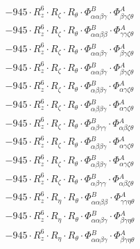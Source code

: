 \documentclass{article}
\begin{document}
\begin{subequations}
\begin{gather}
\begin{array}{c}
 \\[0.2em] 		 - 945 \cdot R_{z}^{6} \cdot R_{\zeta{}} \cdot R_{\theta{}} \cdot \Phi{}^{B}_{\alpha{}\alpha{}\beta{}\gamma{}} \cdot \Phi{}^{A}_{\beta{}\gamma{}\zeta{}\theta{}} 
 \\[0.2em] 		 - 945 \cdot R_{z}^{6} \cdot R_{\zeta{}} \cdot R_{\theta{}} \cdot \Phi{}^{B}_{\alpha{}\alpha{}\beta{}\beta{}} \cdot \Phi{}^{A}_{\gamma{}\gamma{}\zeta{}\theta{}} 
 \\[0.2em] 		 - 945 \cdot R_{z}^{6} \cdot R_{\zeta{}} \cdot R_{\theta{}} \cdot \Phi{}^{B}_{\alpha{}\alpha{}\beta{}\gamma{}} \cdot \Phi{}^{A}_{\beta{}\gamma{}\zeta{}\theta{}} 
 \\[0.2em] 		 - 945 \cdot R_{z}^{6} \cdot R_{\zeta{}} \cdot R_{\theta{}} \cdot \Phi{}^{B}_{\alpha{}\alpha{}\beta{}\gamma{}} \cdot \Phi{}^{A}_{\beta{}\gamma{}\zeta{}\theta{}} 
 \\[0.2em] 		 - 945 \cdot R_{z}^{6} \cdot R_{\zeta{}} \cdot R_{\theta{}} \cdot \Phi{}^{B}_{\alpha{}\beta{}\beta{}\gamma{}} \cdot \Phi{}^{A}_{\alpha{}\gamma{}\zeta{}\theta{}} 
 \\[0.2em] 		 - 945 \cdot R_{z}^{6} \cdot R_{\zeta{}} \cdot R_{\theta{}} \cdot \Phi{}^{B}_{\alpha{}\beta{}\beta{}\gamma{}} \cdot \Phi{}^{A}_{\alpha{}\gamma{}\zeta{}\theta{}} 
 \\[0.2em] 		 - 945 \cdot R_{z}^{6} \cdot R_{\zeta{}} \cdot R_{\theta{}} \cdot \Phi{}^{B}_{\alpha{}\beta{}\gamma{}\gamma{}} \cdot \Phi{}^{A}_{\alpha{}\beta{}\zeta{}\theta{}} 
 \\[0.2em] 		 - 945 \cdot R_{z}^{6} \cdot R_{\zeta{}} \cdot R_{\theta{}} \cdot \Phi{}^{B}_{\alpha{}\beta{}\beta{}\gamma{}} \cdot \Phi{}^{A}_{\alpha{}\gamma{}\zeta{}\theta{}} 
 \\[0.2em] 		 - 945 \cdot R_{z}^{6} \cdot R_{\zeta{}} \cdot R_{\theta{}} \cdot \Phi{}^{B}_{\alpha{}\beta{}\beta{}\gamma{}} \cdot \Phi{}^{A}_{\alpha{}\gamma{}\zeta{}\theta{}} 
 \\[0.2em] 		 - 945 \cdot R_{z}^{6} \cdot R_{\zeta{}} \cdot R_{\theta{}} \cdot \Phi{}^{B}_{\alpha{}\beta{}\gamma{}\gamma{}} \cdot \Phi{}^{A}_{\alpha{}\beta{}\zeta{}\theta{}} 
 \\[0.2em] 		 - 945 \cdot R_{z}^{6} \cdot R_{\eta{}} \cdot R_{\theta{}} \cdot \Phi{}^{B}_{\alpha{}\alpha{}\beta{}\beta{}} \cdot \Phi{}^{A}_{\gamma{}\gamma{}\eta{}\theta{}} 
 \\[0.2em] 		 - 945 \cdot R_{z}^{6} \cdot R_{\eta{}} \cdot R_{\theta{}} \cdot \Phi{}^{B}_{\alpha{}\alpha{}\beta{}\gamma{}} \cdot \Phi{}^{A}_{\beta{}\gamma{}\eta{}\theta{}} 
 \\[0.2em] 		 - 945 \cdot R_{z}^{6} \cdot R_{\eta{}} \cdot R_{\theta{}} \cdot \Phi{}^{B}_{\alpha{}\alpha{}\beta{}\gamma{}} \cdot \Phi{}^{A}_{\beta{}\gamma{}\eta{}\theta{}} 

\end{array}
\end{gather}
\end{subequations}
\end{document}
